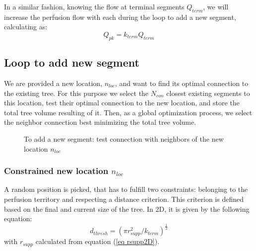 \documentclass[a4paper, 11pt]{article} %
\begin{document}
In a similar fashion, knowing the flow at terminal segments $Q_{term}$, we will increase the perfusion flow with each during the loop to add a new segment, calculating as:
\begin{equation}
Q_{pk} = k_{term} Q_{term}
\end{equation}  




\subsection{Loop to add new segment}
We are provided a new location, $n_{loc}$, and want to find its optimal connection to the existing tree. For this purpose we select the $N_{con}$ closest existing segments to this location, test their optimal connection to the new location, and store the total tree volume resulting of it. Then, as a global optimization process, we select the neighbor connection best minimizing the total tree volume.



\begin{figure}[!h]
\centering
{}
\caption{To add a new segment: test connection with neighbors of the new location $n_{loc}$}
\label{fig:test neighbors}
\end{figure}

\subsubsection{Constrained new location $n_{loc}$}
A random position is picked, that has to fulfill two constraints: belonging to the perfusion territory and respecting a distance criterion. 
This criterion is defined based on the final and current size of the tree. In 2D, it is given by the following equation:
\begin{equation}
d_{thresh} = (\pi r_{supp}^2 / k_{term})^\frac{1}{2}
\end{equation}
with $r_{supp}$ calculated from equation (\ref{eq rsupp2D}).%
\end{document}
